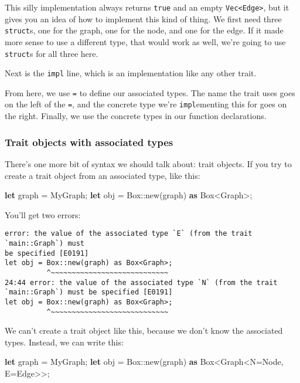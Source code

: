 \documentclass[a4paper,]{book}
\newenvironment{Shaded}{\begin{snugshade}}{\end{snugshade}}
\newcommand{\KeywordTok}[1]{\textcolor[rgb]{0.13,0.29,0.53}{\textbf{{#1}}}}
\newcommand{\NormalTok}[1]{{#1}}
\begin{document}
This silly implementation always returns \texttt{true} and an empty
\texttt{Vec\textless{}Edge\textgreater{}}, but it gives you an idea of
how to implement this kind of thing. We first need three
\texttt{struct}s, one for the graph, one for the node, and one for the
edge. If it made more sense to use a different type, that would work as
well, we're going to use \texttt{struct}s for all three here.

Next is the \texttt{impl} line, which is an implementation like any
other trait.

From here, we use \texttt{=} to define our associated types. The name
the trait uses goes on the left of the \texttt{=}, and the concrete type
we're \texttt{impl}ementing this for goes on the right. Finally, we use
the concrete types in our function declarations.

\subsubsection{Trait objects with associated
types}\label{trait-objects-with-associated-types}

There's one more bit of syntax we should talk about: trait objects. If
you try to create a trait object from an associated type, like this:

\begin{Shaded}
\begin{Highlighting}[]
\KeywordTok{let} \NormalTok{graph = MyGraph;}
\KeywordTok{let} \NormalTok{obj = Box::new(graph) }\KeywordTok{as} \NormalTok{Box<Graph>;}
\end{Highlighting}
\end{Shaded}

You'll get two errors:

\begin{verbatim}
error: the value of the associated type `E` (from the trait `main::Graph`) must
be specified [E0191]
let obj = Box::new(graph) as Box<Graph>;
          ^~~~~~~~~~~~~~~~~~~~~~~~~~~~~
24:44 error: the value of the associated type `N` (from the trait
`main::Graph`) must be specified [E0191]
let obj = Box::new(graph) as Box<Graph>;
          ^~~~~~~~~~~~~~~~~~~~~~~~~~~~~
\end{verbatim}

We can't create a trait object like this, because we don't know the
associated types. Instead, we can write this:

\begin{Shaded}
\begin{Highlighting}[]
\KeywordTok{let} \NormalTok{graph = MyGraph;}
\KeywordTok{let} \NormalTok{obj = Box::new(graph) }\KeywordTok{as} \NormalTok{Box<Graph<N=Node, E=Edge>>;}
\end{Highlighting}
\end{Shaded}
\end{document}
